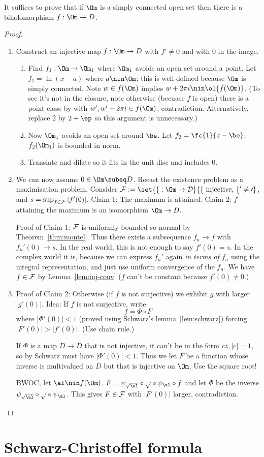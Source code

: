 It suffices to prove that if $\Om$ is a simply connected open set then there is a biholomorphism $f:\Om \to D$.

\begin{proof}
\begin{enumerate}
\item
Construct an injective map $f:\Om \to D$ with $f'\ne 0$ and with 0 in the image.
\begin{enumerate}
\item
Find $f_1:\Om\to \Om_1$ where $\Om_1$ avoids an open set around a point. 
Let $f_1=\ln (x-a)$ where $a\nin \Om$; this is well-defined because $\Om$ is simply connected. 
Note $w\in f(\Om)$ implies $w+ 2\pi i\nin \ol{f(\Om)}$. (To see it's not in the closure, note otherwise (becuase $f$ is open) there is a point close by with $w',w'+2\pi i\in f(\Om)$, contradiction. Alternatively, replace 2 by $2+\ep$ so this argument is unnecessary.)
\item
Now $\Om_1$ avoids an open set around $\be$. Let $f_2=\fc{1}{z-\be}$; $f_2(\Om_1)$ is bounded in norm.
\item
Translate and dilate so it fits in the unit disc and includes 0.
\end{enumerate}
\item 
We can now assume $0\in \Om\subeq D$. 
Recast the existence problem as a maximization problem. Consider $\cal F:=\set{f:\Om \to D}{f\text{ injective, }f'\ne 0}$, and $s=\sup_{f\in \cal F}|f'(0)|$. Claim 1: The maximum is attained. Claim 2: $f$ attaining the maximum is an isomorphism $\Om \to D$.

Proof of Claim 1: $\cal F$ is uniformly bounded so normal by Theorem~\ref{thm:montel}. Thus there exists a subsequence $f_n\to f$ with $f_n'(0)\to s$. In the real world, this is not enough to say $f'(0)=s$. In the complex world it is, because we can express $f_n'$ again {\it in terms of $f_n$} using the integral representation, and just use uniform convergence of the $f_n$. We have $f\in \cal F$ by Lemma~\ref{lem:inj-conv} ($f$ can't be constant because $f'(0)\ne 0$.)
\item
Proof of Claim 2: Otherwise (if $f$ is not surjective) we exhibit $g$ with larger $|g'(0)|$. Idea: If $f$ is not surjective, write
\[
f=\Phi\circ F
\]
where $|\Phi'(0)|<1$ (proved using Schwarz's lemma~\ref{lem:schwarz}) forcing $|F'(0)|>|f'(0)|$. (Use chain rule.)

If $\Phi$ is a map $D\to D$ that is not injective, it can't be in the form $cz,|c|=1$, so by Schwarz must have $|\Phi'(0)|<1$. Thus we let $F$ be a function whose inverse is multivalued on $D$ but that is injective on $\Om$. Use the square root!

BWOC, let $\al\nin f(\Om)$. $F=\psi_{\sqrt{\al}}\circ \sqrt{}\circ \psi_\al\circ f$ and let $\Phi$ be the inverse $\psi_{\sqrt{\al}}\circ \sqrt{}\circ \psi_\al$. This gives $F\in \cal F$ with $|F'(0)|$ larger, contradiction.
\end{enumerate}
\end{proof}

\section{Schwarz-Christoffel formula}




%
 
%
%
